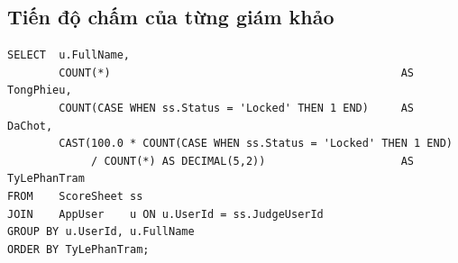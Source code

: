\subsection{Tiến độ chấm của từng giám khảo}

\begin{lstlisting}[style=sqlstyle]
SELECT  u.FullName,
        COUNT(*)                                             AS TongPhieu,
        COUNT(CASE WHEN ss.Status = 'Locked' THEN 1 END)     AS DaChot,
        CAST(100.0 * COUNT(CASE WHEN ss.Status = 'Locked' THEN 1 END)
             / COUNT(*) AS DECIMAL(5,2))                     AS TyLePhanTram
FROM    ScoreSheet ss
JOIN    AppUser    u ON u.UserId = ss.JudgeUserId
GROUP BY u.UserId, u.FullName
ORDER BY TyLePhanTram;
\end{lstlisting}

